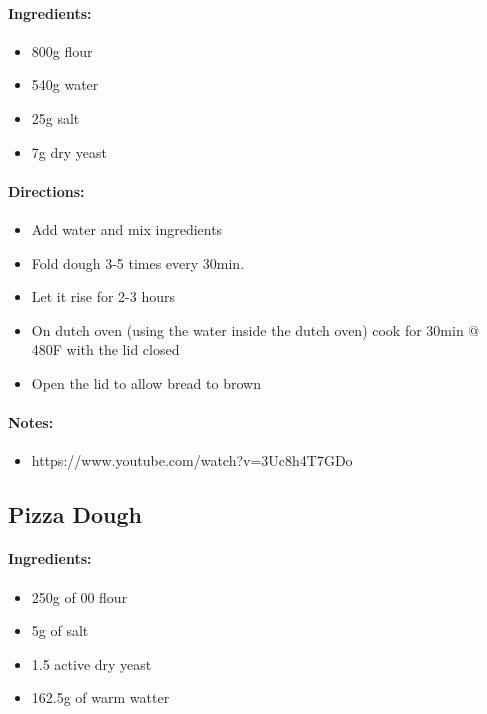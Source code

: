 \documentclass{article}
\begin{document}
\paragraph{Ingredients:}

\begin{itemize}
	\item 800g flour
	\item 540g water
	\item 25g salt
	\item 7g dry yeast
\end{itemize}

\paragraph{Directions:}
\begin{itemize}
	\item Add water and mix ingredients
	\item Fold dough 3-5 times every 30min.
	\item Let it rise for 2-3 hours
	\item On dutch oven (using the water inside the dutch oven) cook for 30min @ 480F with the lid closed
	\item Open the lid to allow bread to brown
\end{itemize}

\paragraph{Notes:}
\begin{itemize}
	\item https://www.youtube.com/watch?v=3Uc8h4T7GDo
\end{itemize}

\subsection{Pizza Dough}


\paragraph{Ingredients:}

\begin{itemize}
	\item 250g of 00 flour
	\item 5g of salt
	\item 1.5 active dry yeast
	\item 162.5g of warm watter
\end{itemize}
\end{document}
